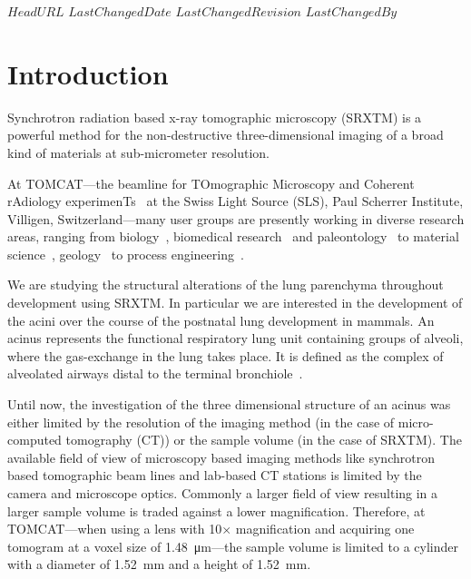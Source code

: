\svnidlong
{$HeadURL$}
{$LastChangedDate$}
{$LastChangedRevision$}
{$LastChangedBy$}

\ifhtml
\else
\begin{center}
\end{center}
\fi

\section{Introduction}

Synchrotron radiation based x-ray tomographic microscopy (SRXTM) is a powerful method for the non-destructive three-dimensional imaging of a broad kind of materials at sub-micrometer resolution.

At TOMCAT---the beamline for TOmographic Microscopy and Coherent rAdiology experimenTs~\cite{Stampanoni2007} at the Swiss Light Source (SLS), Paul Scherrer Institute, Villigen, Switzerland---many user groups are presently working in diverse research areas, ranging from biology~\cite{McDonald2009,PerezHuerta2009}, biomedical research~\cite{Schittny2008,Tsuda2008,Heinzer2008} and paleontology~\cite{Gostling2008,Friis2007,Hagadorn2006,Donoghue2006} to material science~\cite{Gallucci2007}, geology~\cite{Carminati2007} to process engineering~\cite{Davenport2007,Vaucher2007}.

We are studying the structural alterations of the lung parenchyma throughout development using SRXTM. In particular we are interested in the development of the acini over the course of the postnatal lung development in mammals. An acinus represents the functional respiratory lung unit containing groups of alveoli, where the gas-exchange in the lung takes place. It is defined as the complex of alveolated airways distal to the terminal bronchiole~\cite{Rodriguez1987}.

Until now, the investigation of the three dimensional structure of an acinus was either limited by the resolution of the imaging method (in the case of micro-computed tomography (\micro CT)) or the sample volume (in the case of SRXTM). The available field of view of microscopy based imaging methods like synchrotron based tomographic beam lines and lab-based \micro CT stations is limited by the camera and microscope optics. Commonly a larger field of view resulting in a larger sample volume is traded against a lower magnification. Therefore, at TOMCAT---when using a lens with 10$\times$ magnification and acquiring one tomogram at a voxel size of \SI{1.48}{\micro\meter}---the sample volume is limited to a cylinder with a diameter of \SI{1.52}{\milli\meter} and a height of \SI{1.52}{\milli\meter}.

